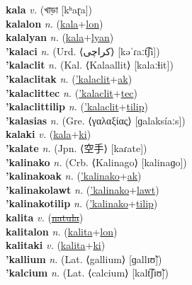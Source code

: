 \textbf{kala} \textit{v.} ({\bengali{}খাড়া} [kʰaɽa])
 \label{kala} \\
\textbf{kalalon} \textit{n.} (\hyperref[kala]{kala}+\hyperref[lon]{lon})
 \label{kalalon} \\
\textbf{kalalyan} \textit{n.} (\hyperref[kala]{kala}+\hyperref[lyan]{lyan})
 \label{kalalyan} \\
\textbf{'kalaci} \textit{n.} (Urd. ⟨کراچی‎⟩ [kəˈɾaːt͡ʃi])
 \label{'kalaci} \\
\textbf{'kalaclit} \textit{n.} (Kal. ⟨Kalaallit⟩ [kalaːɬit])
 \label{'kalaclit} \\
\textbf{'kalaclitak} \textit{n.} (\hyperref['kalaclit]{'kalaclit}+\hyperref[ak]{ak})
 \label{'kalaclitak} \\
\textbf{'kalaclittec} \textit{n.} (\hyperref['kalaclit]{'kalaclit}+\hyperref[tec]{tec})
 \label{'kalaclittec} \\
\textbf{'kalaclittilip} \textit{n.} (\hyperref['kalaclit]{'kalaclit}+\hyperref[tilip]{tilip})
 \label{'kalaclittilip} \\
\textbf{'kalasias} \textit{n.} (Gre. ⟨γαλαξίας⟩ [ɡalaksíaːs])
 \label{'kalasias} \\
\textbf{kalaki} \textit{v.} (\hyperref[kala]{kala}+\hyperref[ki]{ki})
 \label{kalaki} \\
\textbf{'kalate} \textit{n.} (Jpn. ⟨空手⟩ [kaɾate])
 \label{'kalate} \\
\textbf{'kalinako} \textit{n.} (Crb. ⟨Kalinago⟩ [kalinaɡo])
 \label{'kalinako} \\
\textbf{'kalinakoak} \textit{n.} (\hyperref['kalinako]{'kalinako}+\hyperref[ak]{ak})
 \label{'kalinakoak} \\
\textbf{'kalinakolawt} \textit{n.} (\hyperref['kalinako]{'kalinako}+\hyperref[lawt]{lawt})
 \label{'kalinakolawt} \\
\textbf{'kalinakotilip} \textit{n.} (\hyperref['kalinako]{'kalinako}+\hyperref[tilip]{tilip})
 \label{'kalinakotilip} \\
\textbf{kalita} \textit{v.} (\hyperref[natula]{\sout{natula}})
 \label{kalita} \\
\textbf{kalitalon} \textit{n.} (\hyperref[kalita]{kalita}+\hyperref[lon]{lon})
 \label{kalitalon} \\
\textbf{kalitaki} \textit{v.} (\hyperref[kalita]{kalita}+\hyperref[ki]{ki})
 \label{kalitaki} \\
\textbf{'kallium} \textit{n.} (Lat. ⟨gallium⟩ [ɡallɪʊ̃])
 \label{'kallium} \\
\textbf{'kalcium} \textit{n.} (Lat. ⟨calcium⟩ [kalt͡ʃɪʊ̃])
